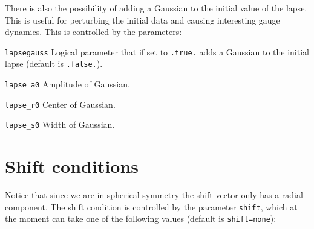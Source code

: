 \documentclass[12pt]{article}
\begin{document}
\vspace{5mm}

There is also the possibility of adding a Gaussian to the initial
value of the lapse. This is useful for perturbing the initial data and
causing interesting gauge dynamics.  This is controlled by the
parameters:

\begin{list}{}{
\setlength{\leftmargin}{35mm}
\setlength{\labelsep}{10mm}
\setlength{\labelwidth}{20mm}}

\item[\texttt{lapsegauss}] Logical parameter that if set to
  \texttt{.true.} adds a Gaussian to the initial lapse (default is
  \texttt{.false.}).

\item[\texttt{lapse\_a0}] Amplitude of Gaussian.

\item[\texttt{lapse\_r0}] Center of Gaussian.

\item[\texttt{lapse\_s0}] Width of Gaussian.

\end{list}

\vspace{3mm}



\setcounter{equation}{0}
\section{Shift conditions}
\label{sec:shift}

Notice that since we are in spherical symmetry the shift vector only
has a radial component.  The shift condition is controlled by the
parameter \texttt{shift}, which at the moment can take one of the
following values (default is \texttt{shift=none}):
\end{document}
